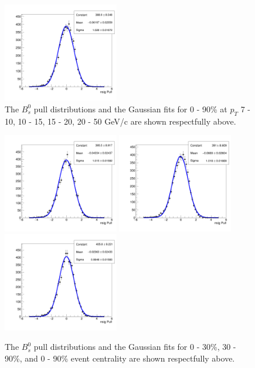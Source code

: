 \begin{figure}[h]
\begin{center}
\includegraphics[width= 0.45\textwidth]{Figures/Chapter5/pull_signal_BptNew_0_90_20_50_0_Bs.png}
\caption{The $B^0_s$ pull distributions and the Gaussian fits for 0 - 90\% at $p_T$ 7 - 10, 10 - 15, 15 - 20, 20 - 50 GeV/c are shown respectfully above.} 
\label{BsPtPull} 
\end{center}
\end{figure}

\begin{figure}[h]
\begin{center}
\includegraphics[width= 0.45\textwidth]{Figures/Chapter5/pull_signal_BptNew_0_30_10_50_0_Bs.png}
\includegraphics[width= 0.45\textwidth]{Figures/Chapter5/pull_signal_BptNew_30_90_10_50_0_Bs.png}
\includegraphics[width= 0.45\textwidth]{Figures/Chapter5/pull_signal_BptNew_0_90_10_50_0_Bs.png}
\caption{The $B^0_s$ pull distributions and the Gaussian fits for 0 - 30\%, 30 - 90\%, and 0 - 90\% event centrality are shown respectfully above.} 
\label{BsCentPull} 
\end{center}
\end{figure}


